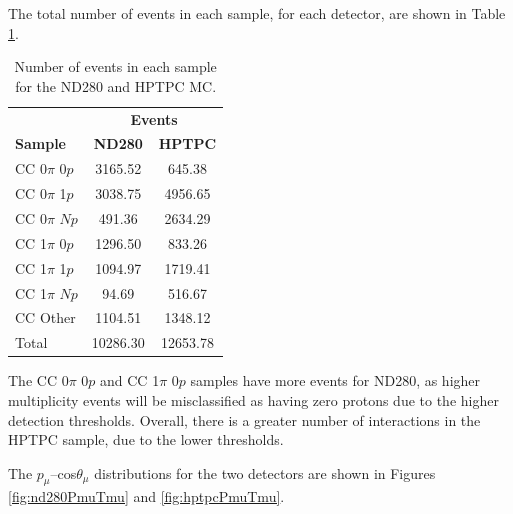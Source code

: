 The total number of events in each sample, for each detector, are shown in Table \ref{tab:hptpcrates}.

\begin{center}
\begin{table}[!htbp]
\center
\begin{tabular}{l ||c c}
\hline \hline
& \multicolumn{2}{c}{\textbf{Events}}\\
\textbf{Sample} & \textbf{ND280} & \textbf{HPTPC} \\
 \hline \hline
CC 0$\pi$ 0$p$ & 3165.52 & 645.38 \\
CC 0$\pi$ 1$p$ & 3038.75 & 4956.65 \\
CC 0$\pi$ $Np$ & 491.36 & 2634.29 \\
CC 1$\pi$ 0$p$ & 1296.50 & 833.26 \\
CC 1$\pi$ 1$p$ & 1094.97 & 1719.41\\
CC 1$\pi$ $Np$ & 94.69 & 516.67 \\
CC Other & 1104.51 & 1348.12 \\
\hline
Total & 10286.30 & 12653.78 \\
\hline \hline
\end{tabular}
\caption{Number of events in each sample for the ND280 and HPTPC MC.}
\label{tab:hptpcrates}
\end{table}
\end{center}

The CC 0$\pi$ 0$p$ and CC 1$\pi$ 0$p$ samples have more events for ND280, as higher multiplicity events will be misclassified as having zero protons due to the higher detection thresholds. Overall, there is a greater number of interactions in the HPTPC sample, due to the lower thresholds.

The $p_{\mu}$--cos$\theta_{\mu}$ distributions for the two detectors are shown in Figures \ref{fig:nd280PmuTmu} and \ref{fig:hptpcPmuTmu}.

